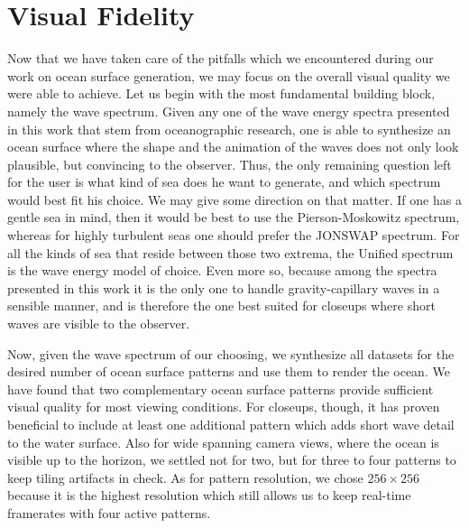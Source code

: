 \section{Visual Fidelity}
\label{sec:results:fidelity}
%
Now that we have taken care of the pitfalls which we encountered during
our work on ocean surface generation, we may focus on the overall visual
quality we were able to achieve.
%
Let us begin with the most fundamental building block, namely the wave spectrum.
Given any one of the wave energy spectra presented in this work
that stem from oceanographic research, one is able to synthesize an ocean
surface where the shape and the animation of the waves does
not only look plausible, but convincing to the observer.
Thus, the only remaining question left for the user is what
kind of sea does he want to generate, and which spectrum would best
fit his choice. We may give some direction on that matter.
If one has a gentle sea in mind, then it would be best to use the Pierson-Moskowitz spectrum, whereas for highly turbulent seas
one should prefer the JONSWAP spectrum. For all the kinds of sea that reside
between those two extrema, the Unified spectrum is the wave energy model of
choice. Even more so, because among the spectra presented in this work it is the
only one to handle gravity-capillary waves in a sensible manner, and is therefore the one best suited for closeups where short waves are visible to the observer.

Now, given the wave spectrum of our choosing, we synthesize all datasets
for the desired number of ocean surface patterns and use them to render
the ocean. We have found that two complementary ocean surface patterns
provide sufficient visual quality for most viewing conditions.
For closeups, though, it has proven beneficial to
include at least one additional pattern which adds short wave detail to
the water surface. Also for wide spanning camera views, where the ocean
is visible up to the horizon, we settled not for two, but for three to
four patterns to keep tiling artifacts in check. As for pattern resolution,
we chose $256\times256$ because it is the highest resolution which
still allows us to keep real-time framerates with four active patterns.

